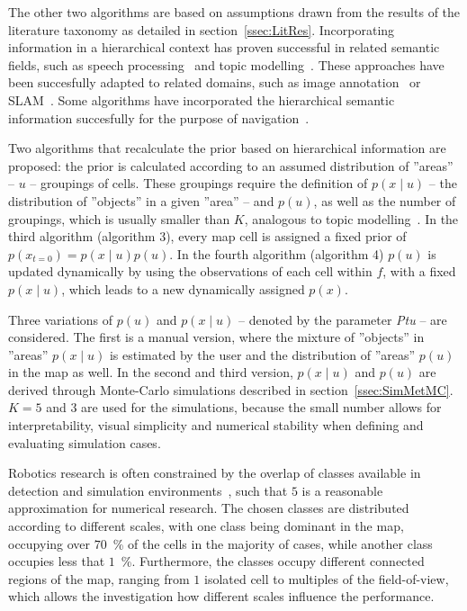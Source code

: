 \documentclass[twocolumn,letterpaper]{IEEEAerospaceCLS}  %
\begin{document}
The other two algorithms are based on assumptions drawn from the results of the literature taxonomy as detailed in section~\ref{ssec:LitRes}. Incorporating information in a hierarchical context has proven successful in related semantic fields, such as speech processing~\cite{fine_hierarchical_1998} and topic modelling~\cite{blei_latent_2003}. These approaches have been succesfully adapted to related domains, such as image annotation~\cite{fei-fei_bayesian_2005,lienou_semantic_2010} or SLAM~\cite{zhang_hierarchical_2019}. Some algorithms have incorporated the hierarchical semantic information succesfully for the purpose of navigation~\cite{koch_automatic_2019,chaplot_object_2020,wu_learning_2018,alirezaie_exploiting_2017}.

Two algorithms  that recalculate the prior based on hierarchical information are proposed: the prior is calculated according to an assumed distribution of ''areas'' -- $u$ -- groupings of cells. These groupings require the definition of $p(x\mid u)$ -- the distribution of ''objects'' in a given ''area'' -- and $p(u)$, as well as the number of groupings, which is usually smaller than $K$, analogous to topic modelling~\cite{blei_latent_2003}. In the third algorithm (algorithm 3), every map cell is assigned a fixed prior of $p(x_{t=0}) = p(x\mid u) p(u)$. In the fourth algorithm (algorithm 4) $p(u)$ is updated dynamically by using the observations of each cell within $f$, with a fixed $p(x\mid u)$, which leads to a new dynamically assigned $p(x)$.

Three variations of $p(u)$ and $p(x\mid u)$ -- denoted by the parameter \emph{Ptu} -- are considered. The first is a manual version, where the mixture of ''objects'' in ''areas'' $p(x\mid u)$ is estimated by the user and the distribution of ''areas'' $p(u)$ in the map as well. In the second and third version, $p(x\mid u)$ and $p(u)$ are derived through Monte-Carlo simulations described in section~\ref{ssec:SimMetMC}. $K=5$ and $3$ are used for the simulations, because the small number allows for interpretability, visual simplicity and numerical stability when defining and evaluating simulation cases.

Robotics research is often constrained by the overlap of classes available in detection and simulation environments~\cite{chaplot_object_2020}, such that $5$ is a reasonable approximation for numerical research. The chosen classes are distributed according to different scales, with one class being dominant in the map, occupying over $70$~\% of the cells in the majority of cases, while another class occupies less that $1$~\%. Furthermore, the classes occupy different connected regions of the map, ranging from $1$ isolated cell to multiples of the field-of-view, which allows the investigation how different scales influence the performance.
\end{document}
